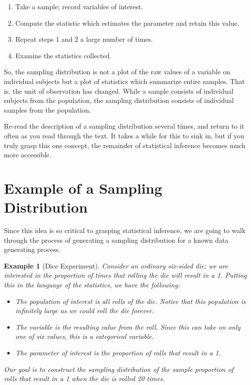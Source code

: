 \documentclass[
]{book}
\providecommand{\tightlist}{%
  \setlength{\itemsep}{0pt}\setlength{\parskip}{0pt}}
\theoremstyle{plain}
\theoremstyle{mydefn}
\theoremstyle{myexmpl}
\newtheorem{example}{Example}[chapter]
\theoremstyle{remark}
\begin{document}
\begin{enumerate}
\def\labelenumi{\arabic{enumi}.}
\tightlist
\item
  Take a sample; record variables of interest.
\item
  Compute the statistic which estimates the parameter and retain this value.
\item
  Repeat steps 1 and 2 a large number of times.
\item
  Examine the statistics collected.
\end{enumerate}

So, the sampling distribution is not a plot of the raw values of a variable on individual subjects but a plot of statistics which summarize entire samples. That is, the unit of observation has changed. While a sample consists of individual subjects from the population, the sampling distribution consists of individual samples from the population.

\begin{rmdtip}
Re-read the description of a sampling distribution several times, and return to it often as you read through the text. It takes a while for this to sink in, but if you truly grasp this one concept, the remainder of statistical inference becomes much more accessible.
\end{rmdtip}

\hypertarget{example-of-a-sampling-distribution}{%
\section{Example of a Sampling Distribution}\label{example-of-a-sampling-distribution}}

Since this idea is so critical to grasping statistical inference, we are going to walk through the process of generating a sampling distribution for a known data generating process.

\begin{example}[Dice Experiment]
\protect\hypertarget{exm:samplingdistns-dice}{}{\label{exm:samplingdistns-dice} {} }Consider an ordinary six-sided die; we are interested in the proportion of times that rolling the die will result in a 1. Putting this in the language of the statistics, we have the following:

\begin{itemize}
\tightlist
\item
  The \emph{population} of interest is all rolls of the die. Notice that this population is infinitely large as we could roll the die forever.
\item
  The \emph{variable} is the resulting value from the roll. Since this can take on only one of six values, this is a categorical variable.
\item
  The \emph{parameter} of interest is the proportion of rolls that result in a 1.
\end{itemize}

Our goal is to construct the sampling distribution of the \emph{sample proportion} of rolls that result in a 1 when the die is rolled 20 times.
\end{example}
\end{document}
